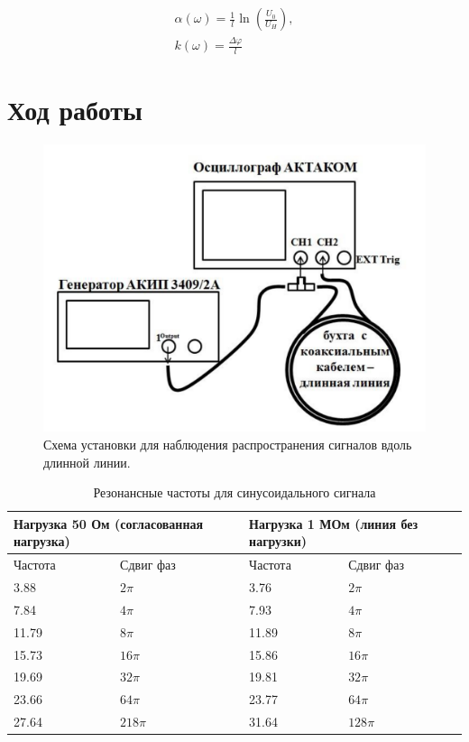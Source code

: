 \documentclass[a4paper,12 pt]{article}
\begin{document}
\begin{gather*}
\alpha(\omega)=\frac{1}{l} \ln \left(\frac{U_{0}}{U_{H}}\right),  \tag{28}\\
k(\omega)=\frac{\Delta \varphi}{l} \tag{29}
\end{gather*}



\section{Ход работы}
\begin{figure}[H]
    \centering
    \includegraphics[scale=0.3]{2.png}
    \caption{Схема установки для наблюдения
распространения сигналов вдоль длинной линии.}
    \label{fig:enter-label}
\end{figure}

\begin{table}[H]
    \centering
    \begin{tabular}{|p{2 cm}|p{2 cm}||p{2 cm}|p{2 cm}|}
    \hline
    \multicolumn{2}{|p{4 cm}||}{Нагрузка 50 Ом (согласованная нагрузка)} & \multicolumn{2}{p{2 cm}|}{Нагрузка 1 МОм (линия без нагрузки)} \\
    \hline
    Частота & Сдвиг фаз & Частота & Сдвиг фаз \\
        \hline
    3.88  &  $ 2 \pi$  & 3.76  & $ 2 \pi$\\
\hline
7.84  &  $ 4 \pi$  & 7.93  & $ 4 \pi$\\
\hline
11.79  &  $ 8 \pi$  & 11.89  & $ 8 \pi$\\
\hline
15.73  &  $ 16 \pi$  &  15.86 & $ 16 \pi$ \\
\hline
19.69  &  $ 32 \pi$  & 19.81  & $ 32 \pi$ \\
\hline
23.66  &  $ 64 \pi$  & 23.77  & $64 \pi$ \\
\hline
27.64  &  $ 218 \pi$  & 31.64& $128 \pi$ \\
\hline
    \end{tabular}
    \caption{Резонансные частоты для синусоидального сигнала}
\end{table}
\end{document}

